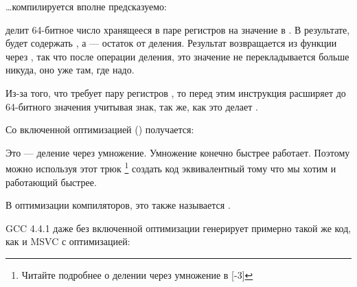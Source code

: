 ﻿

\dots компилируется вполне предсказуемо:



\IDIV делит 64-битное число хранящееся в паре регистров  на значение в \ECX. 
В результате, \EAX будет содержать , а \EDX --- остаток от деления. 
Результат возвращается из функции через \EAX, так что после операции деления, 
это значение не перекладывается больше никуда, 
оно уже там, где надо.

Из-за того, что \IDIV требует пару регистров , то перед этим инструкция  
расширяет \EAX до 64-битного значения учитывая знак, так же, как это делает \MOVSX.

Со включенной оптимизацией (\Ox) получается:



Это --- деление через умножение. Умножение конечно быстрее работает. 
Поэтому можно используя этот трюк
\footnote{Читайте подробнее о делении через умножение в [-3]}
создать код эквивалентный тому что мы хотим и работающий быстрее.

В оптимизации компиляторов, это также называется 
.

GCC 4.4.1 даже без включенной оптимизации генерирует примерно такой же код, 
как и MSVC с оптимизацией:


